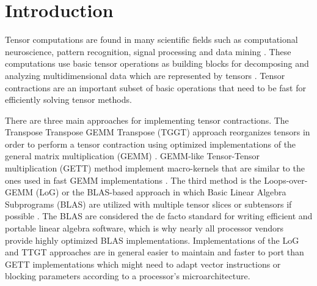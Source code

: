 \section{Introduction}
\label{sec:introduction}
Tensor computations are found in many scientific fields such as computational neuroscience, pattern recognition, signal processing and data mining \citep{karahan:2015:tensor,papalexakis:2017:tensors}.
These computations use basic tensor operations as building blocks for decomposing and analyzing multidimensional data which are represented by tensors \citep{lee:2018:fundamental, kolda:2009:decompositions}. 
Tensor contractions are an important subset of basic operations that need to be fast for efficiently solving tensor methods.

There are three main approaches for implementing tensor contractions.
The Transpose Transpose GEMM Transpose (TGGT) approach reorganizes tensors in order to perform a tensor contraction using optimized implementations of the general matrix multiplication (GEMM) \citep{bader:2006:algorithm862,solomonik:2013:cyclops}.
GEMM-like Tensor-Tensor multiplication (GETT) method implement macro-kernels that are similar to the ones used in fast GEMM implementations \citep{springer:2018:design, matthews:2018:high}.
The third method is the Loops-over-GEMM (LoG) or the BLAS-based approach in which Basic Linear Algebra Subprograms (BLAS) are utilized with multiple tensor slices or subtensors if possible \citep{dinapoli:2014:towards.efficient.use, li:2015:input, shi:2016:tensor.contraction, bassoy:2019:ttv}.
The BLAS are considered the de facto standard for writing efficient and portable linear algebra software, which is why nearly all processor vendors provide highly optimized BLAS implementations.
Implementations of the LoG and TTGT approaches are in general easier to maintain and faster to port than GETT implementations which might need to adapt vector instructions or blocking parameters according to a processor's microarchitecture.


